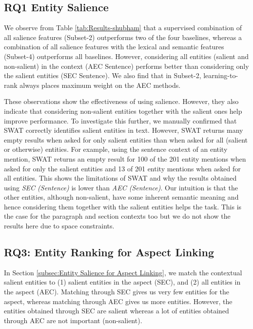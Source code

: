 
\subsection{RQ1 Entity Salience}
\label{subsubsec:Entity Salience}

We observe from Table \ref{tab:Results-shubham} that a supervised combination of all salience features (Subset-2) outperforms two of the four baselines, whereas a combination of all salience features with the lexical and semantic features (Subset-4) outperforms all baselines. However, considering all entities (salient and non-salient) in the context (AEC Sentence) performs better than considering only the salient entities (SEC Sentence). We also find that in Subset-2, learning-to-rank always places maximum weight on the AEC methods.

These observations show the effectiveness of using salience. However, they also indicate that considering non-salient entities together with the salient ones help improve performance. To investigate this further, we manually confirmed that SWAT correctly identifies salient entities in text. 
However,  SWAT returns many empty results when asked for only salient entities than when asked for all (salient or otherwise) entities.
 For example, using the sentence context of an entity mention, SWAT returns an empty result for 100 of the 201 entity mentions when asked for only the salient entities and 13 of 201 entity mentions when asked for all  entities. 
This shows the limitations of SWAT and why the results obtained using \textit{SEC (Sentence)} is lower than \textit{AEC (Sentence)}.  Our intuition is that the other entities, although non-salient, have some inherent semantic meaning and hence considering them together with the salient entities helps the task. This is the case for the paragraph and section contexts too but we do not show the results here due to space constraints. 

\subsection{RQ3: Entity Ranking for Aspect Linking}
In Section \ref{subsec:Entity Salience for Aspect Linking}, we match the contextual salient entities to (1) salient entities in the aspect (SEC), and (2) all entities in the aspect (AEC). Matching through SEC gives us very few entities for the aspect, whereas matching through AEC gives us more entities. However, the entities obtained through SEC are salient whereas a lot of entities obtained through AEC are not important (non-salient). 

